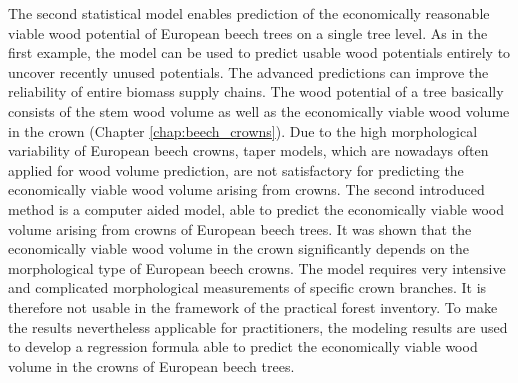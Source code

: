 The second statistical model enables prediction of the economically reasonable viable wood potential of European beech trees on a single tree level. As in the first example, the model can be used to predict usable wood potentials entirely to uncover recently unused potentials. The advanced predictions can improve the reliability of entire biomass supply chains. The wood potential of a tree basically consists of the stem wood volume as well as the economically viable wood volume in the crown (Chapter \ref{chap:beech_crowns}). Due to the high morphological variability of European beech crowns, taper models, which are nowadays often applied for wood volume prediction, are not satisfactory for predicting the economically viable wood volume arising from crowns. The second introduced method is a computer aided model, able to predict the economically viable wood volume arising from crowns of European beech trees. It was shown that the economically viable wood volume in the crown significantly depends on the morphological type of European beech crowns. The model requires very intensive and complicated morphological measurements of specific crown branches. It is therefore not usable in the framework of the practical forest inventory. To make the results nevertheless applicable for practitioners, the modeling results are used to develop a regression formula able to predict the economically viable wood volume in the crowns of European beech trees. 

